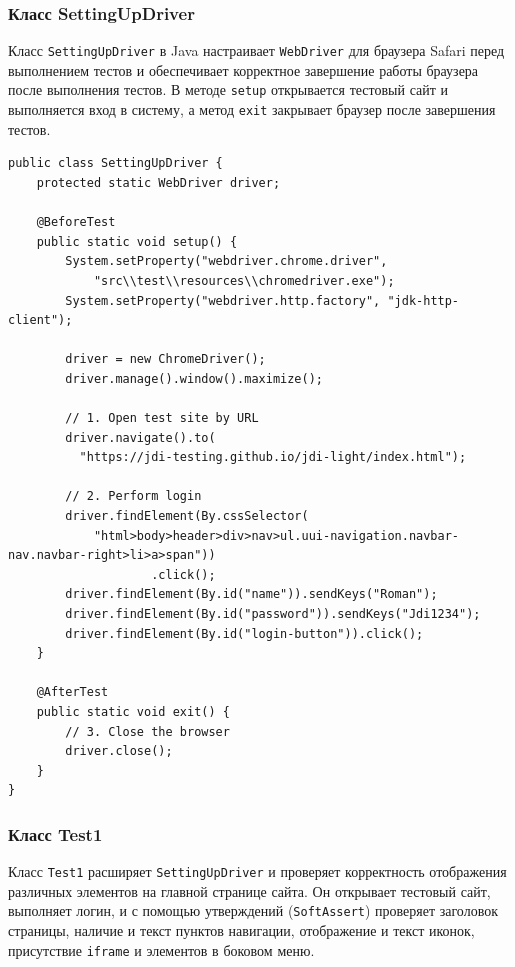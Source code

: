 \documentclass[areasetadvanced]{scrartcl}
\begin{document}
\subsubsection{Класс SettingUpDriver}

Класс \texttt{SettingUpDriver} в Java настраивает \texttt{WebDriver} для браузера Safari перед выполнением тестов и обеспечивает корректное завершение работы браузера после выполнения тестов. В методе \texttt{setup} открывается тестовый сайт и выполняется вход в систему, а метод \texttt{exit} закрывает браузер после завершения тестов.

\begin{lstlisting}[caption={SettingUpDriver}]
public class SettingUpDriver {
	protected static WebDriver driver;
		
	@BeforeTest
	public static void setup() {
		System.setProperty("webdriver.chrome.driver",
			"src\\test\\resources\\chromedriver.exe");
		System.setProperty("webdriver.http.factory", "jdk-http-client");
		
		driver = new ChromeDriver();
		driver.manage().window().maximize();
		
		// 1. Open test site by URL
		driver.navigate().to(
		  "https://jdi-testing.github.io/jdi-light/index.html");
		
		// 2. Perform login
		driver.findElement(By.cssSelector(
			"html>body>header>div>nav>ul.uui-navigation.navbar-nav.navbar-right>li>a>span"))
					.click();
		driver.findElement(By.id("name")).sendKeys("Roman");
		driver.findElement(By.id("password")).sendKeys("Jdi1234");
		driver.findElement(By.id("login-button")).click();
	}
		
	@AfterTest
	public static void exit() {
		// 3. Close the browser
		driver.close();
	}
}
\end{lstlisting}

\subsubsection{Класс Test1}

Класс \texttt{Test1} расширяет \texttt{SettingUpDriver} и проверяет корректность отображения различных элементов на главной странице сайта. Он открывает тестовый сайт, выполняет логин, и с помощью утверждений (\texttt{SoftAssert}) проверяет заголовок страницы, наличие и текст пунктов навигации, отображение и текст иконок, присутствие \texttt{iframe} и элементов в боковом меню.
\end{document}

